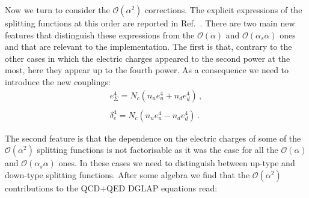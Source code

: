 Now we turn to consider the $\mathcal{O}(\alpha^2)$ corrections. The
explicit expressions of the splitting functions at this order are
reported in Ref.~\cite{deFlorian:2016gvk}. There are two main new
features that distinguish these expressions from the
$\mathcal{O}(\alpha)$ and $\mathcal{O}(\alpha_s\alpha)$ ones and that
are relevant to the implementation. The first is that, contrary to the
other cases in which the electric charges appeared to the second power
at the most, here they appear up to the fourth power. As a consequence
we need to introduce the new couplings:
\begin{equation}
\begin{array}{l}
e_{\Sigma}^4 = N_c(n_{u} e_u^4 + n_{d} e_d^4)\,,\\
\\
\delta_e^4 = N_c(n_{u} e_u^4 - n_{d} e_d^4)\,.
\end{array}
\end{equation}

The second feature is that the dependence on the electric charges of
some of the $\mathcal{O}(\alpha^2)$ splitting functions is not
factorisable as it was the case for all the $\mathcal{O}(\alpha)$ and
$\mathcal{O}(\alpha_s\alpha)$ ones. In these cases we need to
distinguish between up-type and down-type splitting functions. After
some algebra we find that the $\mathcal{O}(\alpha^2)$ contributions to
the QCD+QED DGLAP equations read:


